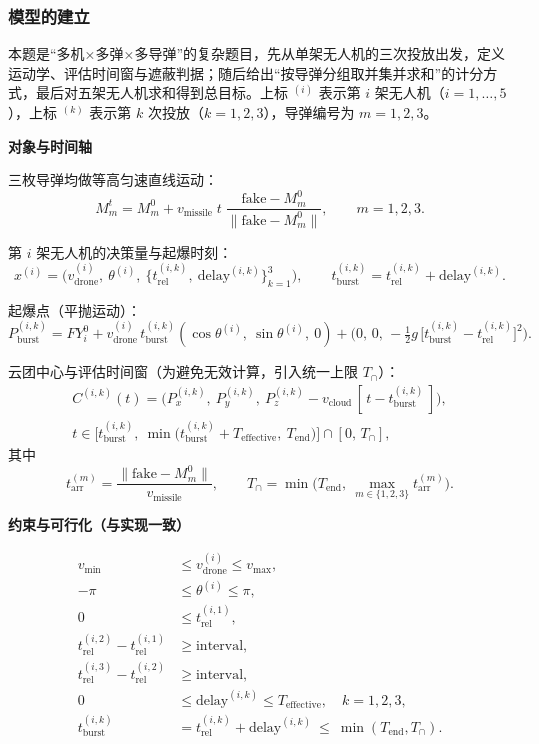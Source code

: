\documentclass[withoutpreface,bwprint]{cumcmthesis} %
\begin{document}
\subsubsection{模型的建立}
本题是“多机×多弹×多导弹”的复杂题目，先从单架无人机的三次投放出发，定义运动学、评估时间窗与遮蔽判据；随后给出“按导弹分组取并集并求和”的计分方式，最后对五架无人机求和得到总目标。上标 $^{(i)}$ 表示第 $i$ 架无人机（$i=1,\dots,5$），上标 $^{(k)}$ 表示第 $k$ 次投放（$k=1,2,3$），导弹编号为 $m=1,2,3$。

\textbf{对象与时间轴}

三枚导弹均做等高匀速直线运动：
\begin{equation}
	M_m^{t}=M_m^{0}+v_{\text{missile}}\;t\;\frac{\mathrm{fake}-M_m^{0}}{\big\|\mathrm{fake}-M_m^{0}\big\|},\qquad m=1,2,3.
\end{equation}

第 $i$ 架无人机的决策量与起爆时刻：
\begin{equation}
	x^{(i)}=\Big(v_{\text{drone}}^{(i)},\ \theta^{(i)},\ \{t_{\text{rel}}^{(i,k)},\ \text{delay}^{(i,k)}\}_{k=1}^3\Big),\qquad
	t_{\text{burst}}^{(i,k)}=t_{\text{rel}}^{(i,k)}+\text{delay}^{(i,k)}.
\end{equation}

起爆点（平抛运动）：
\begin{equation}
	P_{\text{burst}}^{(i,k)}
	=FY_i^{0}
	+v_{\text{drone}}^{(i)}\,t_{\text{burst}}^{(i,k)}(\cos\theta^{(i)},\ \sin\theta^{(i)},\ 0)
	+\Big(0,\,0,\,-\tfrac12 g\,\big[t_{\text{burst}}^{(i,k)}-t_{\text{rel}}^{(i,k)}\big]^2\Big).
\end{equation}

云团中心与评估时间窗（为避免无效计算，引入统一上限 $T_{\cap}$）：
\begin{gather}
	C^{(i,k)}(t)=\Big(P_{x}^{(i,k)},\ P_{y}^{(i,k)},\ P_{z}^{(i,k)}-v_{\text{cloud}}\,[\,t-t_{\text{burst}}^{(i,k)}\,]\Big),\\
	t\in\Big[t_{\text{burst}}^{(i,k)},\ \min\big(t_{\text{burst}}^{(i,k)}+T_{\text{effective}},\ T_{\text{end}}\big)\Big]\cap[0,\,T_{\cap}],
\end{gather}
其中
\begin{equation}
	t_{\text{arr}}^{(m)}=\frac{\big\|\mathrm{fake}-M_m^{0}\big\|}{v_{\text{missile}}},\qquad
	T_{\cap}=\min\!\Big(T_{\text{end}},\ \max_{m\in\{1,2,3\}} t_{\text{arr}}^{(m)}\Big).
\end{equation}

\textbf{约束与可行化（与实现一致）}

\begin{align}
	v_{\min} &\le v_{\text{drone}}^{(i)}\le v_{\max},\\
	-\pi &\le \theta^{(i)}\le \pi,\\
	0 &\le t_{\text{rel}}^{(i,1)},\\
	t_{\text{rel}}^{(i,2)}-t_{\text{rel}}^{(i,1)} &\ge \text{interval},\\
	t_{\text{rel}}^{(i,3)}-t_{\text{rel}}^{(i,2)} &\ge \text{interval},\\
	0 &\le \text{delay}^{(i,k)}\le T_{\text{effective}},\quad k=1,2,3,\\
	t_{\text{burst}}^{(i,k)} &= t_{\text{rel}}^{(i,k)}+\text{delay}^{(i,k)}\ \le\ \min(T_{\text{end}},T_{\cap}).
\end{align}
\end{document}
